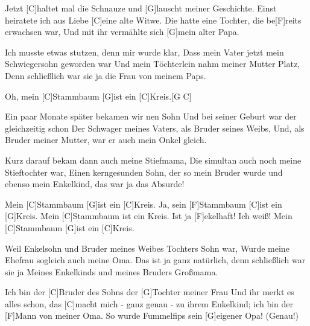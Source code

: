 

\begin{guitar}
	Jetzt [C]haltet mal die Schnauze und [G]lauscht meiner Geschichte.
	Einst heiratete ich aus Liebe [C]eine alte Witwe.
	Die hatte eine Tochter, die be[F]reits erwachsen war,
	Und mit ihr vermählte sich [G]mein alter Papa.
	
	Ich musste etwas stutzen, denn mir wurde klar,
	Dass mein Vater jetzt mein Schwiegersohn geworden war
	Und mein Töchterlein nahm meiner Mutter Platz,
	Denn schließlich war sie ja die Frau von meinem Paps.
	
	\begin{highlightbar}
		Oh, mein [C]Stammbaum [G]ist ein [C]Kreis.[G C]{}
	\end{highlightbar}
	
	\songsection{Strophe 2}
	Ein paar Monate später bekamen wir nen Sohn
	Und bei seiner Geburt war der gleichzeitig schon
	Der Schwager meines Vaters, als Bruder seines Weibs,
	Und, als Bruder meiner Mutter, war er auch mein Onkel gleich.
	
	Kurz darauf bekam dann auch meine Stiefmama,
	Die simultan auch noch meine Stieftochter war,
	Einen kerngesunden Sohn, der so mein Bruder wurde
	und ebenso mein Enkelkind, das war ja das Absurde!
	
	\begin{highlightbar}
		\songsection{Refrain 2}
		Mein [C]Stammbaum [G]ist ein [C]Kreis.
		Ja, sein [F]Stammbaum [C]ist ein [G]Kreis.
		Mein [C]Stammbaum ist ein Kreis. Ist ja [F]ekelhaft! Ich weiß!
		Mein [C]Stammbaum [G]ist ein [C]Kreis.
	\end{highlightbar}
	
	Weil Enkelsohn und Bruder meines Weibes Tochters Sohn war,
	Wurde meine Ehefrau sogleich auch meine Oma.
	Das ist ja ganz natürlich, denn schließlich war sie ja
	Meines Enkelkinds und meines Bruders Großmama.
	
	Ich bin der [C]Bruder des Sohns der [G]Tochter meiner Frau
	Und ihr merkt es alles schon, das [C]macht mich - ganz genau -
	zu ihrem Enkelkind; ich bin der [F]Mann von meiner Oma.
	So wurde Fummelfips sein [G]eigener Opa! (Genau!)
	

\end{guitar}
